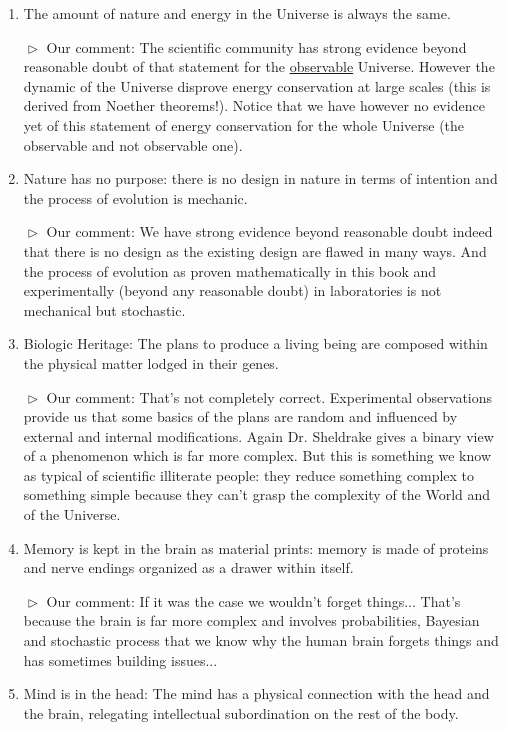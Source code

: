 \begin{enumerate}
		\item \og The amount of nature and energy in the Universe is always the same. \fg{}
		
		$\vartriangleright$ Our comment: The scientific community has strong evidence beyond reasonable doubt of that statement for the \underline{observable} Universe. However the dynamic of the Universe disprove energy conservation at large scales (this is derived from Noether theorems!). Notice that we have however no evidence yet of this statement of energy conservation for the whole Universe (the observable and not observable one).

		\item \og Nature has no purpose: there is no design in nature in terms of intention and the process of evolution is mechanic. \fg{}
		
		$\vartriangleright$ Our comment: We have strong evidence beyond reasonable doubt indeed that there is no design as the existing design are flawed in many ways. And the process of evolution as proven mathematically in this book and experimentally (beyond any reasonable doubt) in laboratories is not mechanical but stochastic.

		\item \og Biologic Heritage: The plans to produce a living being are composed within the physical matter lodged in their genes. \fg{}
		
		$\vartriangleright$ Our comment: That's not completely correct. Experimental observations provide us that some basics of the plans are random and influenced by external and internal modifications. Again Dr. Sheldrake gives a binary view of a phenomenon which is far more complex. But this is something we know as typical of scientific illiterate people: they reduce something complex to something simple because they can't grasp the complexity of the World and of the Universe.

		\item \og Memory is kept in the brain as material prints: memory is made of proteins and nerve endings organized as a drawer within itself. \fg{}
		
		$\vartriangleright$ Our comment: If it was the case we wouldn't forget things... That's because the brain is far more complex and involves probabilities, Bayesian and stochastic process that we know why the human brain forgets things and has sometimes building issues...

		\item \og Mind is in the head: The mind has a physical connection with the head and the brain, relegating intellectual subordination on the rest of the body. \fg{}
		

\end{enumerate}
